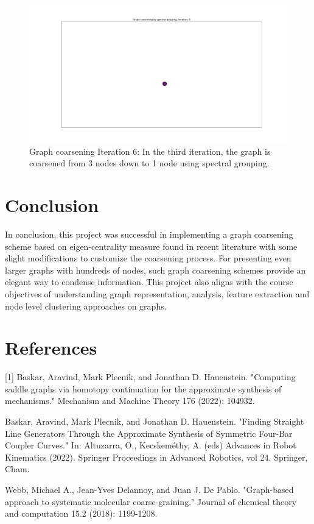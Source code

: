 \documentclass[11pt]{article}
\begin{document}
\begin{figure}[H]
\centering
\includegraphics[width=1\textwidth]{Figure_6.png}
\caption{Graph coarsening Iteration 6: In the third iteration, the graph is coarsened from 3 nodes down to 1 node using spectral grouping.\label{fig:Iteration6}}
\end{figure}

\section{Conclusion}
In conclusion, this project was successful in implementing a graph coarsening scheme based on eigen-centrality measure found in recent literature with some slight modifications to customize the coarsening process. For presenting even larger graphs with hundreds of nodes, such graph coarsening schemes provide an elegant way to condense information. This project also aligns with the course objectives of understanding graph representation, analysis, feature extraction and node level clustering approaches on graphs.

\section*{References}
[1] Baskar, Aravind, Mark Plecnik, and Jonathan D. Hauenstein. "Computing saddle graphs via homotopy continuation for the approximate synthesis of mechanisms." Mechanism and Machine Theory 176 (2022): 104932.

\noindent
[2] Baskar, Aravind, Mark Plecnik, and Jonathan D. Hauenstein. "Finding Straight Line Generators Through the Approximate Synthesis of Symmetric Four-Bar Coupler Curves." In: Altuzarra, O., Kecskeméthy, A. (eds) Advances in Robot Kinematics (2022). Springer Proceedings in Advanced Robotics, vol 24. Springer, Cham.

\noindent
[3] Webb, Michael A., Jean-Yves Delannoy, and Juan J. De Pablo. "Graph-based approach to systematic molecular coarse-graining." Journal of chemical theory and computation 15.2 (2018): 1199-1208.
\end{document}
